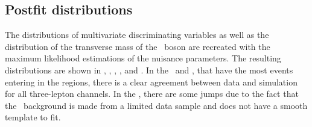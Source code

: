 \newpage

\subsection{Postfit distributions}
 The distributions of multivariate discriminating  variables as well as the distribution of the transverse mass of the \PW\ boson are recreated with the maximum likelihood estimations of the nuisance parameters. The resulting distributions are shown in , , , , and . 
 In the \WZCR\ and \TTSR, that have the most events entering in the regions, there is a clear agreement between data and simulation for all three-lepton channels. In the \STSR, there are some jumps due to the fact that the \NPL\ background is made from a limited data sample and does not have a smooth template to fit. 
